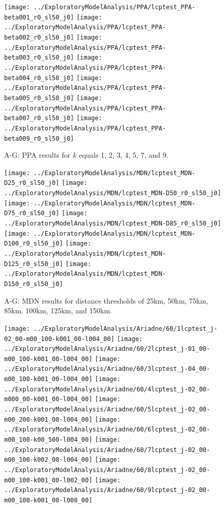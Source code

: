 \documentclass[12pt,a4paper]{thesis}
\begin{document}
\begin{figure}
\centering
\texttt{[image: ../ExploratoryModelAnalysis/PPA/lcptest\_PPA-beta001\_r0\_sl50\_j0]}
\texttt{[image: ../ExploratoryModelAnalysis/PPA/lcptest\_PPA-beta002\_r0\_sl50\_j0]}
\texttt{[image: ../ExploratoryModelAnalysis/PPA/lcptest\_PPA-beta003\_r0\_sl50\_j0]}
\texttt{[image: ../ExploratoryModelAnalysis/PPA/lcptest\_PPA-beta004\_r0\_sl50\_j0]}
\texttt{[image: ../ExploratoryModelAnalysis/PPA/lcptest\_PPA-beta005\_r0\_sl50\_j0]}
\texttt{[image: ../ExploratoryModelAnalysis/PPA/lcptest\_PPA-beta007\_r0\_sl50\_j0]}
\texttt{[image: ../ExploratoryModelAnalysis/PPA/lcptest\_PPA-beta009\_r0\_sl50\_j0]}
\caption{A-G: PPA results for $k$ equals 1, 2, 3, 4, 5, 7, and 9.}
\label{fig:PPA}
\end{figure}

\begin{figure}
\centering
\texttt{[image: ../ExploratoryModelAnalysis/MDN/lcptest\_MDN-D25\_r0\_sl50\_j0]}
\texttt{[image: ../ExploratoryModelAnalysis/MDN/lcptest\_MDN-D50\_r0\_sl50\_j0]}
\texttt{[image: ../ExploratoryModelAnalysis/MDN/lcptest\_MDN-D75\_r0\_sl50\_j0]}
\texttt{[image: ../ExploratoryModelAnalysis/MDN/lcptest\_MDN-D85\_r0\_sl50\_j0]}
\texttt{[image: ../ExploratoryModelAnalysis/MDN/lcptest\_MDN-D100\_r0\_sl50\_j0]}
\texttt{[image: ../ExploratoryModelAnalysis/MDN/lcptest\_MDN-D125\_r0\_sl50\_j0]}
\texttt{[image: ../ExploratoryModelAnalysis/MDN/lcptest\_MDN-D150\_r0\_sl50\_j0]}
\caption{A-G: MDN results for distance thresholds of 25km, 50km, 75km, 85km, 100km, 125km, and 150km.}
\label{fig:MDN}
\end{figure}

\begin{figure}
\centering
\texttt{[image: ../ExploratoryModelAnalysis/Ariadne/60/1lcptest\_j-02\_00-m00\_100-k001\_00-l004\_00]}
\texttt{[image: ../ExploratoryModelAnalysis/Ariadne/60/2lcptest\_j-01\_00-m00\_100-k001\_00-l004\_00]}
\texttt{[image: ../ExploratoryModelAnalysis/Ariadne/60/3lcptest\_j-04\_00-m00\_100-k001\_00-l004\_00]}
\texttt{[image: ../ExploratoryModelAnalysis/Ariadne/60/4lcptest\_j-02\_00-m000\_00-k001\_00-l004\_00]}
\texttt{[image: ../ExploratoryModelAnalysis/Ariadne/60/5lcptest\_j-02\_00-m00\_200-k001\_00-l004\_00]}
\texttt{[image: ../ExploratoryModelAnalysis/Ariadne/60/6lcptest\_j-02\_00-m00\_100-k00\_500-l004\_00]}
\texttt{[image: ../ExploratoryModelAnalysis/Ariadne/60/7lcptest\_j-02\_00-m00\_100-k002\_00-l004\_00]}
\texttt{[image: ../ExploratoryModelAnalysis/Ariadne/60/8lcptest\_j-02\_00-m00\_100-k001\_00-l002\_00]}
\texttt{[image: ../ExploratoryModelAnalysis/Ariadne/60/9lcptest\_j-02\_00-m00\_100-k001\_00-l008\_00]}
\caption{}
\label{fig:60kmAll}
\end{figure}
\end{document}
